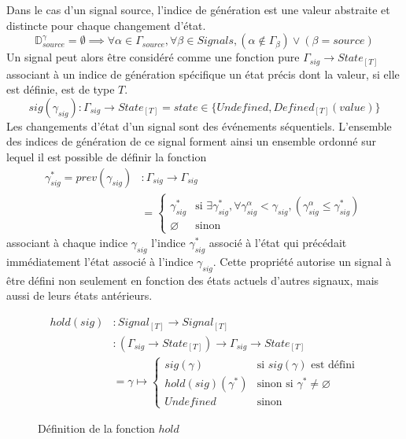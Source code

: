 Dans le cas d'un signal source, l'indice de génération est une valeur abstraite et distincte pour chaque changement d'état.
\[
	\mathbb{D}^\gamma_{source} = \emptyset \implies \forall \alpha \in \Gamma_{source}, \forall \beta \in Signals, (\alpha \notin \Gamma_\beta) \lor (\beta = source)
\]
Un signal peut alors être considéré comme une fonction pure $\Gamma_{sig} \to State_{[T]}$ associant à un indice de génération spécifique un état précis dont la valeur, si elle est définie, est de type $T$.
\[
	sig(\gamma_{sig})\colon \Gamma_{sig} \to State_{[T]} = state \in \{ Undefined, Defined_{[T]}(value) \}
\]
Les changements d'état d'un signal sont des événements séquentiels. L'ensemble des indices de génération de ce signal forment ainsi un ensemble ordonné sur lequel il est possible de définir la fonction
\begin{align*}
	\gamma^*_{sig} = prev(\gamma_{sig}) &\colon \Gamma_{sig} \to \Gamma_{sig}\\
	& = \begin{cases}
		\gamma^*_{sig} & \text{si }
		 \exists \gamma^*_{sig}, \forall \gamma^\alpha_{sig} < \gamma_{sig}, (\gamma^\alpha_{sig} \leq \gamma^*_{sig})\\
		\varnothing & \text{sinon}
	\end{cases}
\end{align*}
associant à chaque indice $\gamma_{sig}$ l'indice $\gamma^*_{sig}$ associé à l'état qui précédait immédiatement l'état associé à l'indice $\gamma_{sig}$. Cette propriété autorise un signal à être défini non seulement en fonction des états actuels d'autres signaux, mais aussi de leurs états antérieurs.

\begin{figure}
	\begin{align*}
		hold (sig) &\colon Signal_{[T]} \to Signal_{[T]} \\
          &\colon (\Gamma_{sig} \to State_{[T]}) \to \Gamma_{sig} \to State_{[T]} \\
          &= \gamma \mapsto \begin{cases}
		           		sig(\gamma) & \text{si } sig(\gamma) \text{ est défini} \\
		           		hold(sig)(\gamma^*) & \text{sinon si } \gamma^* \ne \varnothing \\
		           		Undefined & \text{sinon}
          \end{cases}
	\end{align*}
	\caption{Définition de la fonction $hold$}
	\label{fig:sig-hold}
\end{figure}

